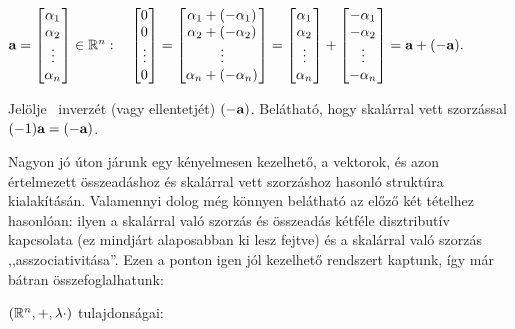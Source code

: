 \documentclass[a4paper,11.5pt]{article}
\begin{document}
	\begin{center}
		$\a=
	\begin{bmatrix}
	\alpha_{1}\s \\
	\alpha_{2}\s \\
	\vdots\\
	\alpha_{n}\s \\
	\end{bmatrix} \in \Rn: \quad
	\begin{bmatrix}
	0\s \\
	0\s \\
	\vdots\\
	0\s \\
	\end{bmatrix}=
	\begin{bmatrix}
	\alpha_{1}+(-\alpha_1)\s \\
	\alpha_{2}+(-\alpha_2)\s \\
	\vdots\\
	\alpha_{n}+(-\alpha_n)\s \\
	\end{bmatrix}=
	\begin{bmatrix}
	\alpha_{1}\s \\
	\alpha_{2}\s \\
	\vdots\\
	\alpha_{n}\s \\
	\end{bmatrix}+
	\begin{bmatrix}
	-\alpha_{1}\s \\
	-\alpha_{2}\s \\
	\vdots\\
	-\alpha_{n}\s \\
	\end{bmatrix}=\a+(-\a).$
	\end{center}
	Jelölje \a~inverzét (vagy ellentetjét) $(-\textbf{a})$. Belátható, hogy skalárral vett szorzással\\ $(-1)\textbf{a}=(-\textbf{a})$.
	
	Nagyon jó úton járunk egy kényelmesen kezelhető, a vektorok, és azon értelmezett összeadáshoz és skalárral vett szorzáshoz hasonló struktúra kialakításán. Valamennyi dolog még könnyen belátható az előző két tételhez hasonlóan: ilyen a skalárral való szorzás és összeadás kétféle disztributív kapcsolata (ez mindjárt alaposabban ki lesz fejtve) és a skalárral való szorzás ,,asszociativitása''. Ezen a ponton igen jól kezelhető rendszert kaptunk, így már bátran összefoglalhatunk:
	
	\medskip
	$(\mathbb{R}^{n}, +, \lambda \cdot )$ {tulajdonságai:}
	
\end{document}
